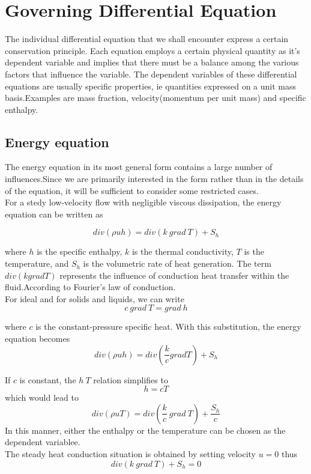 \section{Governing Differential Equation }

The individual differential equation that we shall encounter express a certain conservation principle. Each equation employs a certain physical quantity as it's dependent variable and implies that there must be a balance among the various factors that influence the variable. The dependent variables of these differential equations are usually specific properties, ie quantities expressed on a unit mass basis.Examples are mass fraction, velocity(momentum per unit mass) and specific enthalpy.

\subsection{Energy equation}

The energy equation in its most general form contains a large number of influences.Since we are primarily interested in the form rather than in the details of the equation, it will be sufficient to consider some restricted cases.
\\
For a stedy low-velocity flow with negligible viscous dissipation, the energy equation can be written as 

\begin{equation}
div(\rho uh)=div(k \ grad \ T) + S_h
\end{equation}  

where $h$ is the specific enthalpy, $k$ is the thermal conductivity, $T$ is the temperature, and $S_h$ is the volumetric rate of heat generation. The term $div(k grad T)$ represents the influence of conduction heat transfer within the fluid.According to Fourier's law of conduction.
\\
For ideal and for solids and liquids, we can write
 \begin{equation}
 c \ grad  \ T = grad \ h
 \end{equation}  
 
 where $c$ is the constant-pressure specific heat. With this substitution, the energy equation becomes
 \begin{equation}
 div(\rho uh)=div(\frac{k}{c} grad T) + S_h
 \end{equation}  
 
 If $c$ is constant, the $ h~T $ relation simplifies to
 \begin{equation}
 h=cT
 \end{equation}  
 which would lead to
 \begin{equation}
 div(\rho uT)=div(\dfrac{k}{c} \ grad \ T) + \dfrac{S_h}{c}
 \end{equation}  
 In this manner, either the enthalpy or the temperature can be chosen as the dependent variablee.
 \\
 The steady heat conduction situation is obtained by setting velocity $u = 0$ thus
 \begin{equation}
 div(k \ grad \ T) + S_h = 0
 \end{equation}  

